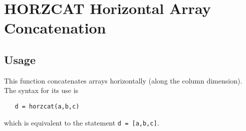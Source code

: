 \section{HORZCAT Horizontal Array Concatenation}

\subsection{Usage}

This function concatenates arrays horizontally (along the column
dimension).  The syntax for its use is
\begin{verbatim}
   d = horzcat(a,b,c)
\end{verbatim}
which is equivalent to the statement \verb|d = [a,b,c]|.
